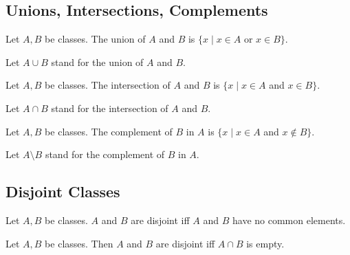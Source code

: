 \documentclass[10pt]{article}
\begin{document}
  \subsection*{Unions, Intersections, Complements}

  \begin{forthel}
    \begin{definition}[id=FOUNDATIONS_01_2159753924968448,printid]
      Let $A, B$ be classes.
      The union of $A$ and $B$ is $\{ x \mid x \in A$ or $x \in B \}$.
    \end{definition}

    Let $A \cup B$ stand for the union of $A$ and $B$.
  \end{forthel}

  \begin{forthel}
    \begin{definition}[id=FOUNDATIONS_01_5744033011859456,printid]
      Let $A, B$ be classes.
      The intersection of $A$ and $B$ is $\{ x \mid x \in A$ and $x \in B \}$.
    \end{definition}

    Let $A \cap B$ stand for the intersection of $A$ and $B$.
  \end{forthel}

  \begin{forthel}
    \begin{definition}[id=FOUNDATIONS_01_7620345041256448,printid]
      Let $A, B$ be classes.
      The complement of $B$ in $A$ is $\{ x \mid x \in A$ and $x \notin B \}$.
    \end{definition}

    Let $A \setminus B$ stand for the complement of $B$ in $A$.
  \end{forthel}


  \subsection*{Disjoint Classes}

  \begin{forthel}
    \begin{definition}[id=FOUNDATIONS_01_4981913324355584,printid]
      Let $A, B$ be classes.
      $A$ and $B$ are disjoint iff $A$ and $B$ have no common elements.
    \end{definition}
  \end{forthel}

  \begin{forthel}
    \begin{proposition}[id=FOUNDATIONS_01_1211191546347520,printid]
      Let $A, B$ be classes.
      Then $A$ and $B$ are disjoint iff $A \cap B$ is empty.
    \end{proposition}
  \end{forthel}
\end{document}
